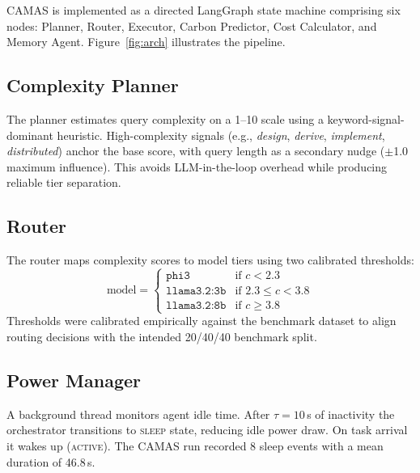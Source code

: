 \documentclass[conference]{IEEEtran}
\begin{document}
CAMAS is implemented as a directed LangGraph state machine comprising six
nodes: Planner, Router, Executor, Carbon Predictor, Cost Calculator, and
Memory Agent. Figure~\ref{fig:arch} illustrates the pipeline.


\subsection{Complexity Planner}
The planner estimates query complexity on a 1--10 scale using a keyword-signal-
dominant heuristic. High-complexity signals (e.g., \emph{design}, \emph{derive},
\emph{implement}, \emph{distributed}) anchor the base score, with query length
as a secondary nudge ($\pm$1.0 maximum influence). This avoids LLM-in-the-loop
overhead while producing reliable tier separation.

\subsection{Router}
The router maps complexity scores to model tiers using two calibrated thresholds:
\begin{equation}
  \text{model} =
  \begin{cases}
    \texttt{phi3}        & \text{if } c < 2.3 \\
    \texttt{llama3.2:3b} & \text{if } 2.3 \le c < 3.8 \\
    \texttt{llama3.2:8b} & \text{if } c \ge 3.8
  \end{cases}
\end{equation}
Thresholds were calibrated empirically against the benchmark dataset to align
routing decisions with the intended 20/40/40 benchmark split.

\subsection{Power Manager}
A background thread monitors agent idle time. After $\tau = 10$\,s of
inactivity the orchestrator transitions to \textsc{sleep} state, reducing idle
power draw. On task arrival it wakes up (\textsc{active}). The CAMAS run
recorded 8 sleep events with a mean duration of 46.8\,s.
\end{document}
